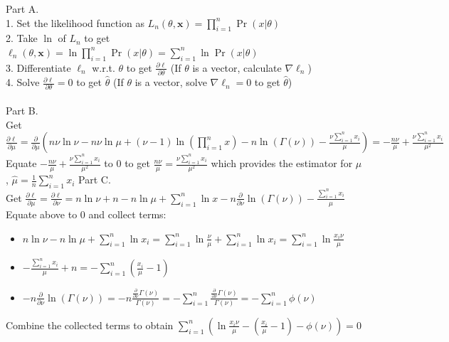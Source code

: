 \documentclass[]{../util/ColumbiaAssm}
\begin{document}
\begin{questions}
\begin{solution}
\newline Part A. \\
1. Set the likelihood function as $L_n (\theta, \mathbf{x}) = \prod\limits^{n}_{i=1} \Pr(x|\theta)$\\
2. Take $\ln$ of $L_n$ to get $\ell_n(\theta, \mathbf{x}) = \ln \prod\limits^{n}_{i=1} \Pr(x|\theta) = \sum\limits^{n}_{i=1} \ln\Pr(x|\theta)$\\
3. Differentiate $\ell_n$ w.r.t. $\theta$ to get $\frac{\partial \ell}{\partial \theta}$ (If $\theta$ is a vector, calculate $\nabla \ell_n$)\\
4. Solve $\frac{\partial \ell}{\partial \theta} = 0$ to get $\hat{\theta}$ (If $\theta$ is a vector, solve $\nabla \ell_n = 0$ to get $\hat{\theta}$)\\ \\
Part B.\\
Get $\frac{\partial \ell}{\partial \mu} = \frac{\partial}{\partial \mu} (n \nu \ln \nu - n \nu \ln \mu + (\nu - 1)\ln(\prod\limits^{n}_{i=1} x) - n\ln(\Gamma(\nu)) - \frac{\nu \sum\limits^{n}_{i=1} x_i}{\mu}) = - \frac{n\nu}{\mu} + \frac{\nu \sum\limits^{n}_{i=1} x_i}{\mu^2}$\\
Equate $- \frac{n\nu}{\mu} + \frac{\nu \sum\limits^{n}_{i=1} x_i}{\mu^2}$ to 0 to get $\frac{n\nu}{\mu} = \frac{\nu \sum\limits^{n}_{i=1} x_i}{\mu^2}$ which provides the estimator for $\mu$, $\hat{\mu} = \frac{1}{n} \sum\limits^{n}_{i=1} x_i$
\newpage
Part C.\\
Get $\frac{\partial \ell}{\partial \mu} = \frac{\partial \ell}{\partial \nu} = n\ln \nu + n - n\ln \mu + \sum\limits^{n}_{i=1} \ln x - n \frac{\partial}{\partial \nu} \ln(\Gamma(\nu)) - \frac{\sum\limits^{n}_{i=1} x_i}{\mu}$\\
Equate above to 0 and collect terms: 
\begin{itemize}
\item $n\ln \nu - n\ln \mu + \sum\limits^{n}_{i=1} \ln x_i = \sum\limits^{n}_{i=1} \ln \frac{\nu}{\mu} + \sum\limits^{n}_{i=1} \ln x_i = \sum\limits^{n}_{i=1} \ln \frac{x_i \nu}{\mu}$
\item $-\frac{\sum\limits^{n}_{i=1} x_i}{\mu} + n = - \sum\limits^{n}_{i=1} (\frac{x_i}{\mu} - 1)$
\item $- n \frac{\partial}{\partial \nu} \ln(\Gamma(\nu)) = - n \frac{\frac{\partial}{\partial \nu}\Gamma(\nu)}{\Gamma(\nu)} =  - \sum\limits^{n}_{i=1} \frac{\frac{\partial}{\partial \nu}\Gamma(\nu)}{\Gamma(\nu)} = -\sum\limits^{n}_{i=1} \phi(\nu)$
\end{itemize} 
Combine the collected terms to obtain $\sum\limits^{n}_{i=1}(\ln \frac{x_i \nu}{\mu} - (\frac{x_i}{\mu} - 1) - \phi(\nu)) = 0$
%



\end{solution}
\end{questions}
\end{document}
